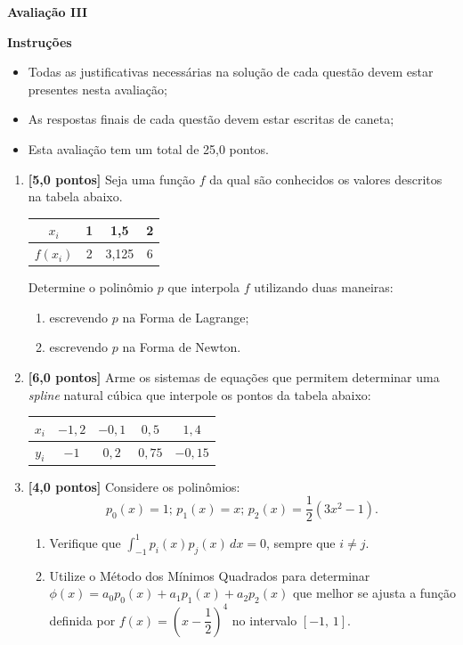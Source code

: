 \documentclass[11pt,a4paper]{article}
\begin{document}
\begin{center}
 \textbf{Avaliação III}
\end{center}

\textbf{Instruções}
\begin{itemize}
 \item Todas as justificativas necessárias na solução de cada questão devem estar presentes nesta avaliação;
 \item As respostas finais de cada questão devem estar escritas de caneta;
 \item Esta avaliação tem um total de 25,0 pontos.
\end{itemize}

\begin{enumerate}
 
 \item \textbf{[5,0 pontos]} Seja uma função $f$ da qual são conhecidos os valores descritos na tabela abaixo.
\begin{center}
 \begin{tabular}{c|c|c|c}
  $x_i$ & 1 & 1,5 & 2\\ \hline
  $f(x_i)$ & 2 & 3,125 & 6
 \end{tabular}
\end{center}

  Determine o polinômio $p$ que interpola $f$ utilizando duas maneiras:
  \begin{enumerate}
   \item escrevendo $p$ na Forma de Lagrange;
   \item escrevendo $p$ na Forma de Newton.
  \end{enumerate}

  \item \textbf{[6,0 pontos]} Arme os sistemas de equações que permitem determinar uma \textit{spline} natural cúbica que interpole os pontos da tabela abaixo:

   \begin{center}
   \begin{tabular}{c|c|c|c|c}
      $x_i$ & $-1,2$ & $-0,1$ & $0,5$ & $1,4$ \\ \hline
      $y_i$ & $-1$ & $0,2$ & $0,75$ & $-0,15$
   \end{tabular}
   \end{center}

  \item \textbf{[4,0 pontos]} Considere os polinômios:
$$p_0(x) = 1;\, p_1(x) = x;\,p_2(x) = \frac{1}{2}(3x^2 - 1).$$


   \begin{enumerate}
    \item Verifique que $\displaystyle\int_{-1}^1 p_i(x)p_j(x)\,dx = 0$, sempre que $i\neq j$.
    \item Utilize o Método dos Mínimos Quadrados para determinar $\phi(x) = a_0p_0(x) + a_1p_1(x) + a_2p_2(x)$ que melhor se ajusta a função definida por 
          $f(x) = \left(x - \dfrac{1}{2}\right)^4$ no intervalo $[-1,\, 1]$.
   \end{enumerate}



\end{enumerate}
\end{document}
